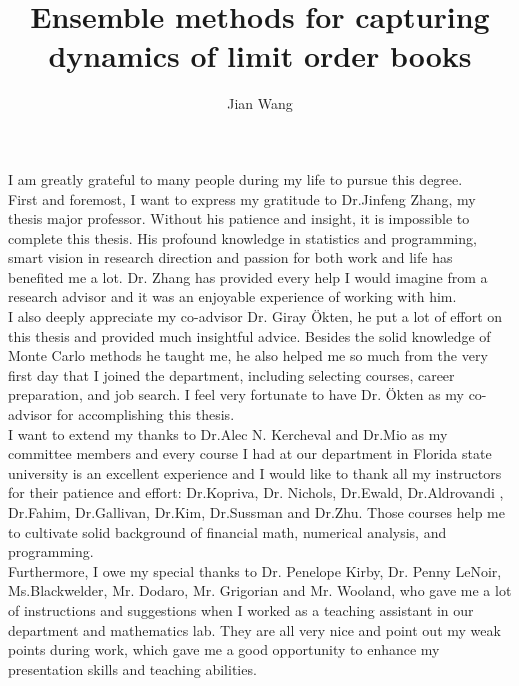 \documentclass[11pt,  expanded,  copyright]{fsuthesis}
\title{Ensemble methods for capturing dynamics of limit order books}
\author{Jian Wang}
\begin{document}
\frontmatter
\maketitle
\makecommitteepage
\newcommand{\tabincell}[2]{\begin{tabular}{@{}#1@{}}#2\end{tabular}}


\begin{acknowledgments}
I am greatly grateful to many people during my life to pursue this degree.\\

First and foremost,   I want to express my gratitude to Dr.Jinfeng Zhang,   my thesis major professor. Without his patience and insight,   it is impossible to complete this thesis. His profound knowledge in statistics and programming,   smart vision in research direction and passion for both work and life has benefited me a lot. Dr. Zhang has provided every help I would imagine from a research advisor and it was an enjoyable experience of working with him.\\

I also deeply appreciate my co-advisor Dr. Giray \"{O}kten,   he put a lot of effort on this thesis and provided much insightful advice. Besides the solid knowledge of Monte Carlo methods he taught me,   he also helped me so much from the very first day that I joined the department,   including selecting courses,  career preparation,   and job search. I feel very fortunate to have Dr. \"{O}kten as my co-advisor for accomplishing this thesis.\\

I want to extend my thanks to Dr.Alec N. Kercheval and Dr.Mio as my committee members and every course I had at our department in Florida state university is an excellent experience and I would like to thank all my instructors for their patience and effort: Dr.Kopriva,   Dr. Nichols,   Dr.Ewald,   Dr.Aldrovandi ,   Dr.Fahim,   Dr.Gallivan,   Dr.Kim,   Dr.Sussman and Dr.Zhu. Those courses help me to cultivate solid background of financial math,   numerical analysis, and programming.\\
  
Furthermore,   I owe my special thanks to  Dr. Penelope Kirby,   Dr. Penny LeNoir,   Ms.Blackwelder,   Mr. Dodaro,   Mr. Grigorian and Mr. Wooland,   who gave me a lot of instructions and suggestions when I worked as a teaching assistant in our department and mathematics lab. They are all very nice and point out my weak points during work,   which gave me a good opportunity to enhance my presentation skills and teaching abilities.\\


\end{acknowledgments}
\end{document}
